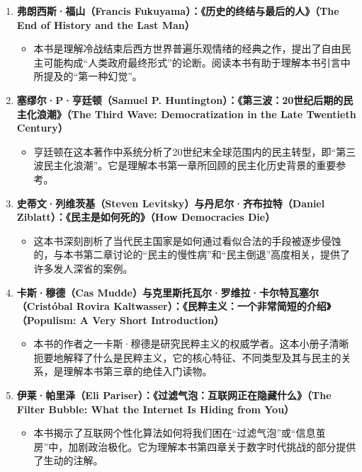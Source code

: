 \documentclass[UTF8, 10pt]{ctexbook}
\begin{document}
\begin{enumerate}
    \item  \textbf{弗朗西斯·福山（Francis Fukuyama）：《历史的终结与最后的人》（The End of History and the Last Man）}
    \begin{itemize}
        \item   本书是理解冷战结束后西方世界普遍乐观情绪的经典之作，提出了自由民主可能构成“人类政府最终形式”的论断。阅读本书有助于理解本书引言中所提及的“第一种幻觉”。
    \end{itemize}

    \item  \textbf{塞缪尔·P·亨廷顿（Samuel P. Huntington）：《第三波：20世纪后期的民主化浪潮》（The Third Wave: Democratization in the Late Twentieth Century）}
    \begin{itemize}
        \item   亨廷顿在这本著作中系统分析了20世纪末全球范围内的民主转型，即“第三波民主化浪潮”。它是理解本书第一章所回顾的民主化历史背景的重要参考。
    \end{itemize}

    \item  \textbf{史蒂文·列维茨基（Steven Levitsky）与丹尼尔·齐布拉特（Daniel Ziblatt）：《民主是如何死的》（How Democracies Die）}
    \begin{itemize}
        \item   这本书深刻剖析了当代民主国家是如何通过看似合法的手段被逐步侵蚀的，与本书第二章讨论的“民主的慢性病”和“民主倒退”高度相关，提供了许多发人深省的案例。
    \end{itemize}

    \item  \textbf{卡斯·穆德（Cas Mudde）与克里斯托瓦尔·罗维拉·卡尔特瓦塞尔（Cristóbal Rovira Kaltwasser）：《民粹主义：一个非常简短的介绍》（Populism: A Very Short Introduction）}
    \begin{itemize}
        \item   本书的作者之一卡斯·穆德是研究民粹主义的权威学者。这本小册子清晰扼要地解释了什么是民粹主义，它的核心特征、不同类型及其与民主的关系，是理解本书第三章的绝佳入门读物。
    \end{itemize}

    \item  \textbf{伊莱·帕里泽（Eli Pariser）：《过滤气泡：互联网正在隐藏什么》（The Filter Bubble: What the Internet Is Hiding from You）}
    \begin{itemize}
        \item   本书揭示了互联网个性化算法如何将我们困在“过滤气泡”或“信息茧房”中，加剧政治极化。它为理解本书第四章关于数字时代挑战的部分提供了生动的注解。
    \end{itemize}


\end{enumerate}
\end{document}
